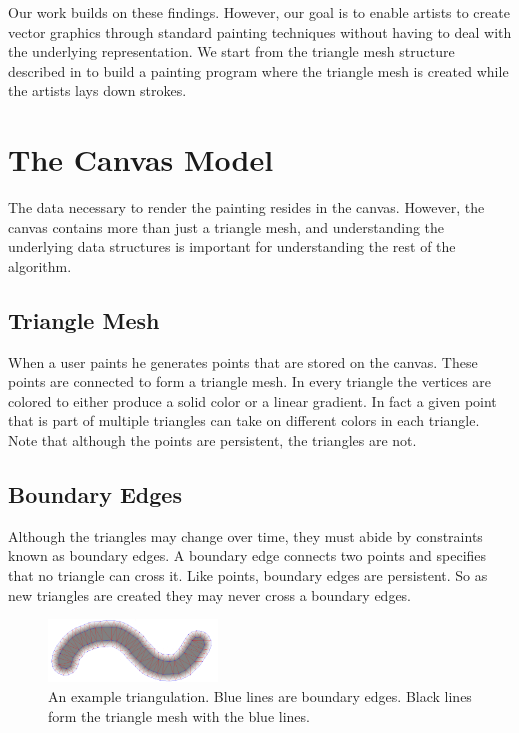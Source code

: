 \documentclass[review]{acmsiggraph}
\begin{document}
Our work builds on these findings. However, our goal is to enable artists to create vector
graphics through standard painting techniques without having to deal with the underlying representation.
We start from the triangle mesh structure described in \cite{10.1109/TVCG.2012.76} to build a painting program
where the triangle mesh is created while the artists lays down strokes. 

\section{The Canvas Model}
The data necessary to render the painting resides in the canvas. However, the canvas contains more than just
a triangle mesh, and understanding the underlying data structures is important for 
understanding the rest of the algorithm.

\subsection{Triangle Mesh}
When a user paints he generates points that are stored on the canvas. These points are
connected to form a triangle mesh. In every triangle the vertices are colored to either
produce a solid color or a linear gradient. In fact a given point that is part of
multiple triangles can take on different colors in each triangle. Note that although
the points are persistent, the triangles are not.

\subsection{Boundary Edges}
Although the triangles may change over time, they must abide by constraints known as
boundary edges. A boundary edge connects two points and specifies that no triangle
can cross it. Like points, boundary edges are persistent. So as new triangles are created they
may never cross a boundary edges.


\begin{figure}
    \centering
        \includegraphics[width=0.4\textwidth]{images/stroke}
    \caption{An example triangulation. Blue lines are boundary edges. Black lines form the triangle
    mesh with the blue lines.}
\end{figure}
\end{document}
